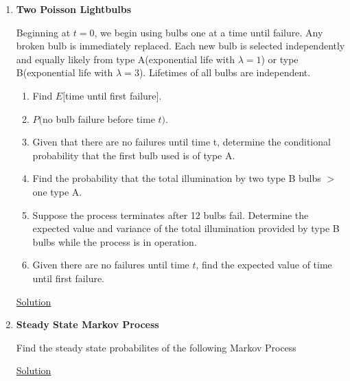 \documentclass[11pt, a4paper]{article}
\begin{document}
\begin{enumerate}
    \item \hypertarget{q_poissonbulb2}{\textbf{Two Poisson Lightbulbs}}\newline
    Beginning at $t=0$, we begin using bulbs one at a time until failure. Any broken bulb is immediately replaced. Each new bulb is selected independently and equally likely from type A(exponential life with $\lambda = 1$) or type B(exponential life with $\lambda = 3$). Lifetimes of all bulbs are independent.
    \begin{enumerate}
        \item Find $E[$time until first failure$]$.
        \item $P($no bulb failure before time $t)$.
        \item Given that there are no failures until time t, determine the conditional probability that the first bulb used is of type A.
        \item Find the probability that the total illumination by two type B bulbs $>$ one type A.
        \item Suppose the process terminates after 12 bulbs fail. Determine the expected value and variance of the total illumination provided by type B bulbs while the process is in operation.
        \item Given there are no failures until time $t$, find the expected value of time until first failure.
    \end{enumerate}
    \hyperlink{a_poissonbulb2}{Solution}

    \item \hypertarget{q_steadymarkov}{\textbf{Steady State Markov Process}}\newline
    Find the steady state probabilites of the following Markov Process\newline
    \begin{center}
    \end{center}
    \hyperlink{a_steadymarkov}{Solution}


\end{enumerate}
\end{document}
